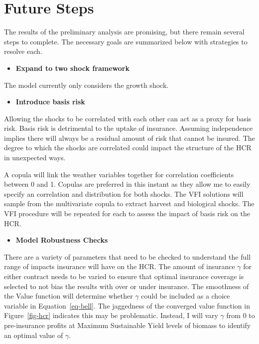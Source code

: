 \documentclass[
  letterpaper,
  DIV=11,
  numbers=noendperiod]{scrartcl}
\providecommand{\tightlist}{%
  \setlength{\itemsep}{0pt}\setlength{\parskip}{0pt}}\usepackage{longtable,booktabs,array}
\begin{document}
\hypertarget{sec-fut}{%
\section{Future Steps}\label{sec-fut}}

The results of the preliminary analysis are promising, but there remain
several steps to complete. The necessary goals are summarized below with
strategies to resolve each.

\begin{itemize}
\tightlist
\item
  \textbf{Expand to two shock framework}
\end{itemize}

The model currently only considers the growth shock.

\begin{itemize}
\tightlist
\item
  \textbf{Introduce basis risk}
\end{itemize}

Allowing the shocks to be correlated with each other can act as a proxy
for basis risk. Basis risk is detrimental to the uptake of insurance.
Assuming independence implies there will always be a residual amount of
risk that cannot be insured. The degree to which the shocks are
correlated could impact the structure of the HCR in unexpected ways.

A copula will link the weather variables together for correlation
coefficients between 0 and 1. Copulas are preferred in this instant as
they allow me to easily specify an correlation and distribution for both
shocks. The VFI solutions will sample from the multivariate copula to
extract harvest and biological shocks. The VFI procedure will be
repeated for each to assess the impact of basis risk on the HCR.

\begin{itemize}
\tightlist
\item
  \textbf{Model Robustness Checks}
\end{itemize}

There are a variety of parameters that need to be checked to understand
the full range of impacts insurance will have on the HCR. The amount of
insurance \(\gamma\) for either contract needs to be varied to ensure
that optimal insurance coverage is selected to not bias the results with
over or under insurance. The smoothness of the Value function will
determine whether \(\gamma\) could be included as a choice variable in
Equation~\ref{eq-bell}. The jaggedness of the converged value function
in Figure~\ref{fig-hcr} indicates this may be problematic. Instead, I
will vary \(\gamma\) from 0 to pre-insurance profits at Maximum
Sustainable Yield levels of biomass to identify an optimal value of
\(\gamma\).
\end{document}
